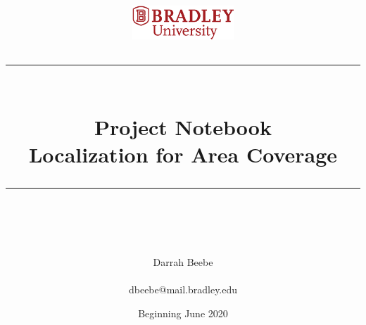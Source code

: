\documentclass[fontsize=11pt, %
                             paper=letter, %
                             twoside, %
                             captions=tableheading,
                             index=totoc,
                             hyperref]{labbook}
\newcommand{\HRule}{\rule{\linewidth}{0.5mm}} %
\begin{document}

\title{
\begin{center}
\href{http://www.bradley.edu}{\includegraphics[height=0.5in]{figs/logoBU1-Print}}
\vskip10pt
\HRule \\[0.4cm]
{\Huge \bfseries Project Notebook \\[0.5cm] \Large Localization for Area Coverage}\\[0.4cm] %
\HRule \\[1.5cm]
\end{center}
}
\author{\Huge Darrah Beebe \\ \\ \LARGE dbeebe@mail.bradley.edu \\[2cm]} %
\date{Beginning June 2020} %
\maketitle %

\printindex
\tableofcontents %
\newpage %
\end{document}
